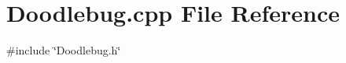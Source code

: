 \section{Doodlebug.\+cpp File Reference}
\label{Doodlebug_8cpp}
{\ttfamily \#include \char`\"{}Doodlebug.\+h\char`\"{}}\newline
